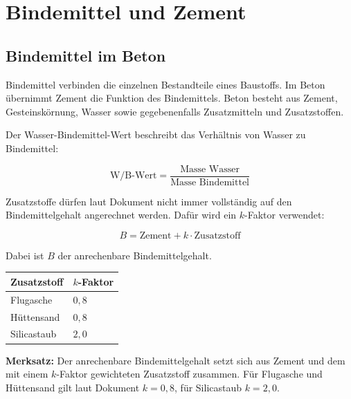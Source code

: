 \documentclass[
  12pt,
  a4paper,
  oneside
]{scrreprt}
\begin{document}
\chapter{Bindemittel und Zement}

\section{Bindemittel im Beton}

Bindemittel verbinden die einzelnen Bestandteile eines Baustoffs.
Im Beton übernimmt Zement die Funktion des Bindemittels. Beton besteht
aus Zement, Gesteinskörnung, Wasser sowie gegebenenfalls Zusatzmitteln
und Zusatzstoffen. 

Der Wasser-Bindemittel-Wert beschreibt das Verhältnis von Wasser zu
Bindemittel:

\begin{equation}
  \text{W/B-Wert}
  =
  \frac{\text{Masse Wasser}}
  {\text{Masse Bindemittel}}
\end{equation}

Zusatzstoffe dürfen laut Dokument nicht immer vollständig auf den
Bindemittelgehalt angerechnet werden. Dafür wird ein $k$-Faktor
verwendet:

\begin{equation}
  B =
  \text{Zement}
  +
  k \cdot \text{Zusatzstoff}
\end{equation}

Dabei ist $B$ der anrechenbare Bindemittelgehalt.


\begin{longtable}{
  >{\raggedright\arraybackslash}p{}
  >{\centering\arraybackslash}p{}
}
\toprule
\textbf{Zusatzstoff} & \textbf{$k$-Faktor} \\
\midrule
\endhead

Flugasche & $0{,}8$ \\

Hüttensand & $0{,}8$ \\

Silicastaub & $2{,}0$ \\

\bottomrule
\end{longtable}



\begin{merksatzbox}
\textbf{Merksatz:}
Der anrechenbare Bindemittelgehalt setzt sich aus Zement und dem mit
einem $k$-Faktor gewichteten Zusatzstoff zusammen. Für Flugasche und
Hüttensand gilt laut Dokument $k=0{,}8$, für Silicastaub $k=2{,}0$.

\end{merksatzbox}
\end{document}
